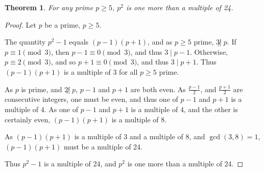 \documentclass[11pt]{article}
\newtheorem{theorem}{Theorem}[section]
\begin{document}
\begin{theorem}
    For any prime $p \geq 5$, $p^2$ is one more than a multiple of 24.
\end{theorem}

\begin{proof}
    Let $p$ be a prime, $p \geq 5$.

    The quantity ${p^2 - 1}$ equals ${(p-1)(p+1)}$, and as ${p \geq 5}$ prime, ${3 \not|\; p}$.
    If ${p \equiv 1 \pmod{3}}$, then ${p-1 \equiv 0 \pmod{3}}$, and thus ${3 \mid p-1}$.
    Otherwise, ${p \equiv 2 \pmod{3}}$, and so ${p+1 \equiv 0 \pmod{3}}$, and thus ${3 \mid p+1}$.
    Thus ${(p-1)(p+1)}$ is a multiple of 3 for all ${p \geq 5}$ prime.

    As $p$ is prime, and ${2 \not|\; p}$, ${p-1}$ and ${p+1}$ are both even.
    As $\frac{p-1}{2}$, and $\frac{p+1}{2}$ are consecutive integers, one must be even, and thus one of ${p-1}$ and ${p+1}$ is a multiple of 4.
    As one of ${p-1}$ and ${p+1}$ is a multiple of 4, and the other is certainly even, ${(p-1)(p+1)}$ is a multiple of 8.

    As ${(p-1)(p+1)}$ is a multiple of 3 and a multiple of 8, and $\gcd(3, 8) = 1$, ${(p-1)(p+1)}$ must be a multiple of 24.

    Thus ${p^2-1}$ is a multiple of 24, and $p^2$ is one more than a multiple of 24.

\end{proof}
\end{document}
